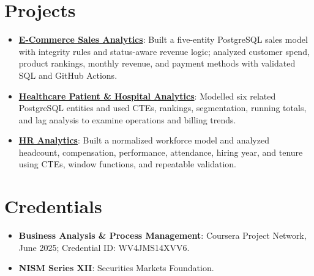 \documentclass[letterpaper,11pt]{article}
\newcommand{\resumeProject}[2]{
  \item\small{\textbf{#1}: #2\vspace{-2pt}}
}
\newcommand{\resumeSubHeadingListStart}{\begin{itemize}[leftmargin=*]}
\newcommand{\resumeSubHeadingListEnd}{\end{itemize}}
\begin{document}
\section{Projects}
\resumeSubHeadingListStart
  \resumeProject{\href{https://github.com/jainalimehta/Ecommerce-Sales-Analytics}{E-Commerce Sales Analytics}}{Built a five-entity PostgreSQL sales model with integrity rules and status-aware revenue logic; analyzed customer spend, product rankings, monthly revenue, and payment methods with validated SQL and GitHub Actions.}
  \resumeProject{\href{https://github.com/jainalimehta/Healthcare-Analytics}{Healthcare Patient \& Hospital Analytics}}{Modelled six related PostgreSQL entities and used CTEs, rankings, segmentation, running totals, and lag analysis to examine operations and billing trends.}
  \resumeProject{\href{https://github.com/jainalimehta/HR-Analytics}{HR Analytics}}{Built a normalized workforce model and analyzed headcount, compensation, performance, attendance, hiring year, and tenure using CTEs, window functions, and repeatable validation.}
\resumeSubHeadingListEnd

\section{Credentials}
\resumeSubHeadingListStart
  \resumeProject{Business Analysis \& Process Management}{Coursera Project Network, June 2025; Credential ID: WV4JMS14XVV6.}
  \resumeProject{NISM Series XII}{Securities Markets Foundation.}
\resumeSubHeadingListEnd
\end{document}
